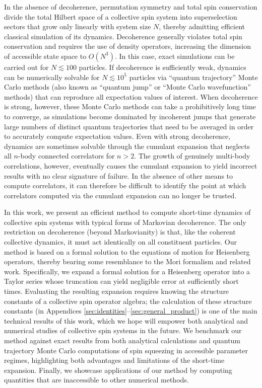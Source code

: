 \documentclass[aps,pra,twocolumn,longbibliography]{revtex4-2}
\newcommand{\p}[1]{\left( #1 \right)} %
\newcommand{\1}{\mathds{1}}
\begin{document}
In the absence of decoherence, permutation symmetry and total spin
conservation divide the total Hilbert space of a collective spin
system into superselection sectors that grow only linearly with system
size $N$, thereby admitting efficient classical simulation of its
dynamics.  Decoherence generally violates total spin conservation and
requires the use of density operators, increasing the dimension of
accessible state space to $O\p{N^3}$\cite{hartmann2016generalized,
  xu2013simulating}.  In this case, exact simulations can be carried
out for $N\lesssim100$ particles.  If decoherence is sufficiently
weak, dynamics can be numerically solvable for $N\lesssim10^5$
particles via ``quantum trajectory'' Monte Carlo
methods\cite{plenio1998quantumjump, zhang2018montecarlo} (also known
as ``quantum jump'' or ``Monte Carlo wavefunction'' methods) that can
reproduce all expectation values of interest.  When decoherence is
strong, however, these Monte Carlo methods can take a prohibitively
long time to converge, as simulations become dominated by incoherent
jumps that generate large numbers of distinct quantum trajectories
that need to be averaged in order to accurately compute expectation
values.  Even with strong decoherence, dynamics are sometimes solvable
through the cumulant expansion\cite{meiser2010steadystate} that
neglects all $n$-body connected correlators for $n>2$.  The growth of
genuinely multi-body correlations, however, eventually causes the
cumulant expansion to yield incorrect results with no clear signature
of failure.  In the absence of other means to compute correlators, it
can therefore be difficult to identify the point at which correlators
computed via the cumulant expansion can no longer be trusted.

In this work, we present an efficient method to compute short-time
dynamics of collective spin systems with typical forms of Markovian
decoherence.  The only restriction on decoherence (beyond
Markovianity) is that, like the coherent collective dynamics, it must
act identically on all constituent particles.  Our method is based on
a formal solution to the equations of motion for Heisenberg operators,
thereby bearing some resemblance to the Mori
formalism\cite{mori1965continuedfraction} and related
work\cite{annett1994recursive}.  Specifically, we expand a formal
solution for a Heisenberg operator into a Taylor series whose
truncation can yield negligible error at sufficiently short times.
Evaluating the resulting expansion requires knowing the structure
constants of a collective spin operator algebra; the calculation of
these structure constants (in Appendices
\ref{sec:identities}--\ref{sec:general_product}) is one of the main
technical results of this work, which we hope will empower both
analytical and numerical studies of collective spin systems in the
future.  We benchmark our method against exact results from both
analytical calculations and quantum trajectory Monte Carlo
computations of spin squeezing in accessible parameter regimes,
highlighting both advantages and limitations of the short-time
expansion.  Finally, we showcase applications of our method by
computing quantities that are inaccessible to other numerical methods.
\end{document}

